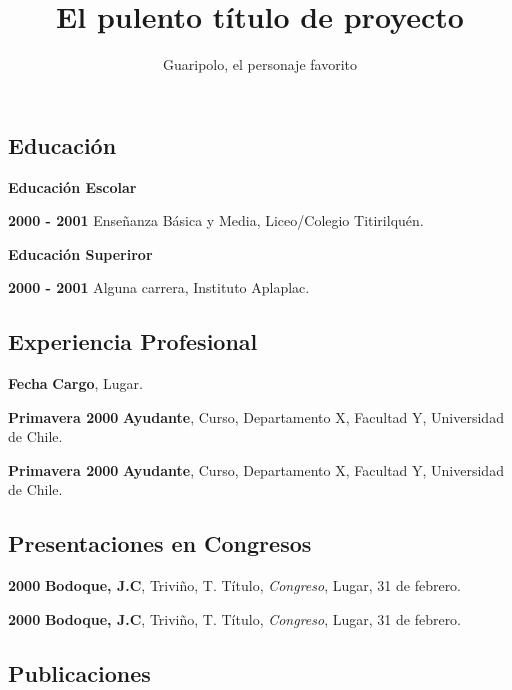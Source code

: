 \documentclass{proyectotesis}
\title{El pulento título de proyecto}
\author{Guaripolo, el personaje favorito}
\begin{document}
\setlength{\cvlabelwidth}{45mm}             %

\maketitlepage
\makepersonalinfo

\subsection{Educación}
\begin{cvlist}{}
\item[\bf Educación Escolar]
\item[\textbf{2000 - 2001}]  Enseñanza Básica y Media, Liceo/Colegio Titirilquén.
\item[\textbf{Educación Superiror}] 
\item[\textbf{2000 - 2001}] Alguna carrera, Instituto Aplaplac.
\end{cvlist}

\subsection{Experiencia Profesional}
\begin{cvlist}{}
\item[\textbf{Fecha}]  \textbf{Cargo}, Lugar.   
\item[\textbf{Primavera 2000}]   \textbf{Ayudante},  Curso, Departamento X, Facultad Y, Universidad de Chile.
\item[\textbf{Primavera 2000}]   \textbf{Ayudante},  Curso, Departamento X, Facultad Y, Universidad de Chile.

\end{cvlist}

\subsection{Presentaciones en Congresos}

\begin{cvlist}{}
\item[\textbf{2000}] \textbf{Bodoque, J.C}, Triviño, T. Título, {\it Congreso}, Lugar, 31 de febrero.
\item[\textbf{2000}] \textbf{Bodoque, J.C}, Triviño, T. Título, {\it Congreso}, Lugar, 31 de febrero.

\end{cvlist}

\subsection{Publicaciones}
\end{document}
